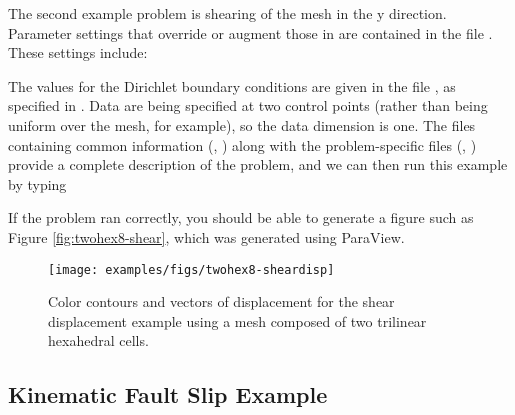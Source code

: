 The second example problem is shearing of the mesh in the y direction.
Parameter settings that override or augment those in 
are contained in the file . These settings include:
\begin{inventory}
\end{inventory}
The values for the Dirichlet boundary conditions are given in the
file , as specified in .
Data are being specified at two control points (rather than being
uniform over the mesh, for example), so the data dimension is one.
The files containing common information (, )
along with the problem-specific files (, )
provide a complete description of the problem, and we can then run
this example by typing
If the problem ran correctly, you should be able to generate a figure
such as Figure \vref{fig:twohex8-shear}, which was generated using
ParaView.

\begin{figure}
  \texttt{[image: examples/figs/twohex8-sheardisp]}
  \caption{Color contours and vectors of displacement for the shear displacement
    example using a mesh composed of two trilinear hexahedral cells.}
  \label{fig:twohex8-shear}
\end{figure}


\subsection{Kinematic Fault Slip Example}

